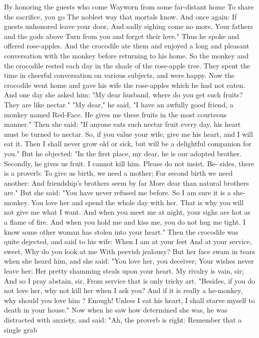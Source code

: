 \documentclass{book}
\begin{document}
By honoring the guests who come
Wayworn from some far-distant home
To share the sacrifice, you go
The noblest way that mortals know.
And once again:
If guests unhonored leave your door,
And sadly sighing come no more,
Your fathers and the gods above
Turn from you and forget their love."
Thus he spoke and offered rose-apples. And the
crocodile ate them and enjoyed a long and pleasant
conversation with the monkey before returning to
his home. So the monkey and the crocodile rested
each day in the shade of the rose-apple tree. They
spent the time in cheerful conversation on various
subjects, and were happy.
Now the crocodile went home and gave his wife
the rose-apples which he had not eaten. And one
day she asked him: "My dear husband, where do you
get such fruits? They are like nectar."
"My dear," he said, "I have an awfully good
friend, a monkey named Red-Face. He gives me these
fruits in the most courteous manner."
Then she said: "If anyone eats such nectar fruit
every day, his heart must be turned to nectar. So,
if you value your wife, give me his heart, and I will
eat it. Then I shall never grow old or sick, but will
be a delightful companion for you."
But he objected: "In the first place, my dear,
he is our adopted brother. Secondly, he gives us
fruit. I cannot kill him. Please do not insist. Be-
sides, there is a proverb:
To give us birth, we need a mother;
For second birth we need another:
And friendship's brothers seem by far
More dear than natural brothers are."
But she said: "You have never refused me before.
So I am sure it is a she-monkey. You love her and
spend the whole day with her. That is why you will
not give me what I want. And when you meet me at
night, your sighs are hot as a flame of fire. And when
you hold me and kiss me, you do not hug me tight.
I know some other woman has stolen into your
heart."
Then the crocodile was quite dejected, and said to
his wife:
When I am at your feet
And at your service, sweet,
Why do you look at me
With peevish jealousy?
But her face swam in tears when she heard him,
and she said:
"You love her, you deceiver;
Your wishes never leave her;
Her pretty shamming steals upon your heart.
My rivalry is vain, sir;
And so I pray abstain, sir,
From service that is only tricky art.
"Besides, if you do not love her, why not kill her
when I ask you? And if it is really a he-monkey, why
should you love him ? Enough! Unless I eat his heart,
I shall starve myself to death in your house."
Now when he saw how determined she was, he
was distracted with anxiety, and said: "Ah, the
proverb is right:
Remember that a single grab
\end{document}
